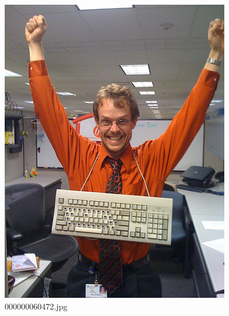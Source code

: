     \begin{figure}[h]
        \centering
        \includegraphics[width=0.8\linewidth]{../image set/easy/000000060472.jpg}
        \caption{000000060472.jpg}
    \end{figure}
